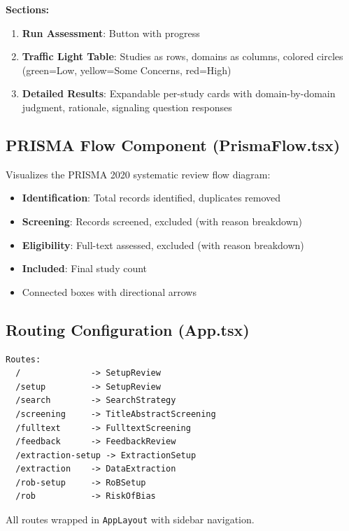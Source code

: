 \documentclass[11pt,a4paper]{article}
\begin{document}
\textbf{Sections:}
\begin{enumerate}[nosep]
  \item \textbf{Run Assessment}: Button with progress
  \item \textbf{Traffic Light Table}: Studies as rows, domains as columns, colored circles (green=Low, yellow=Some Concerns, red=High)
  \item \textbf{Detailed Results}: Expandable per-study cards with domain-by-domain judgment, rationale, signaling question responses
\end{enumerate}

\subsection{PRISMA Flow Component (PrismaFlow.tsx)}

Visualizes the PRISMA 2020 systematic review flow diagram:
\begin{itemize}[nosep]
  \item \textbf{Identification}: Total records identified, duplicates removed
  \item \textbf{Screening}: Records screened, excluded (with reason breakdown)
  \item \textbf{Eligibility}: Full-text assessed, excluded (with reason breakdown)
  \item \textbf{Included}: Final study count
  \item Connected boxes with directional arrows
\end{itemize}

\subsection{Routing Configuration (App.tsx)}

\begin{lstlisting}[style=typescript, title=Route Definitions]
Routes:
  /              -> SetupReview
  /setup         -> SetupReview
  /search        -> SearchStrategy
  /screening     -> TitleAbstractScreening
  /fulltext      -> FulltextScreening
  /feedback      -> FeedbackReview
  /extraction-setup -> ExtractionSetup
  /extraction    -> DataExtraction
  /rob-setup     -> RoBSetup
  /rob           -> RiskOfBias
\end{lstlisting}

All routes wrapped in \texttt{AppLayout} with sidebar navigation.

\end{document}
